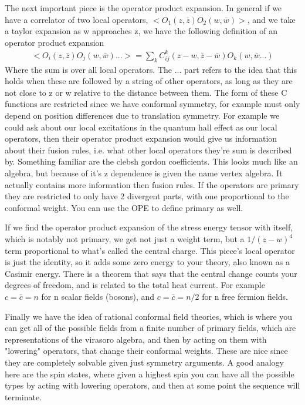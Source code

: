 The next important piece is the operator product expansion. In general if we have a correlator of two local operators, $<O_1(z,\bar{z})O_2(w,\bar{w})>$, and we take a taylor expansion as w approaches z, we have the following definition of an operator product expansion
\begin{align}
<O_i(z,\bar{z})O_j(w,\bar{w})...> = \sum_k C^k_{ij}(z-w,\bar{z}- \bar{w}) O_k(w,\bar{w}...)
\end{align}
Where the sum is over all local operators. The ... part refers to the idea that this holds when these are followed by a string of other operators, as long as they are not close to z or w relative to the distance between them. The form of these C functions are restricted since we have conformal symmetry, for example must only depend on position differences due to translation symmetry. For example we could ask about our local excitations in the quantum hall effect as our local operators, then their operator product expansion would give us information about their fusion rules, i.e. what other local operators they're sum is described by. Something familiar are the clebsh gordon coefficients. This looks much like an algebra, but because of it's z dependence is given the name vertex algebra. It actually contains more information then fusion rules. If the operators are primary they are restricted to only have 2 divergent parts, with one proportional to the conformal weight. You can use the OPE to define primary as well.

If we find the operator product expansion of the stress energy tensor with itself, which is notably not primary, we get not just a weight term, but a $1/(z-w)^4$ term proportional to what's called the central charge. This piece's local operator is just the identity, so it adds some zero energy to your theory, also known as a Casimir energy. There is a theorem that says that the central change counts your degrees of freedom, and is related to the total heat current. For example $c=\bar{c}=n$ for n scalar fields (bosons), and $c=\bar{c}=n/2$ for n free fermion fields.

Finally we have the idea of rational conformal field theories, which is where you can get all of the possible fields from a finite number of primary fields, which are representations of the virasoro algebra, and then by acting on them with "lowering" operators, that change their conformal weights. These are nice since they are completely solvable given just symmetry arguments. A good analogy here are the spin states, where given a highest spin you can have all the possible types by acting with lowering operators, and then at some point the sequence will terminate.

